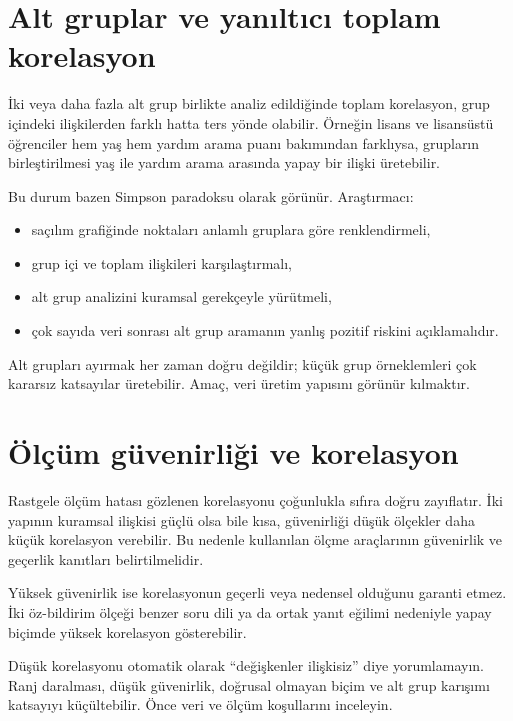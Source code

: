 \section{Alt gruplar ve yanıltıcı toplam korelasyon}

İki veya daha fazla alt grup birlikte analiz edildiğinde toplam korelasyon,
grup içindeki ilişkilerden farklı hatta ters yönde olabilir. Örneğin lisans ve
lisansüstü öğrenciler hem yaş hem yardım arama puanı bakımından farklıysa,
grupların birleştirilmesi yaş ile yardım arama arasında yapay bir ilişki
üretebilir.

Bu durum bazen Simpson paradoksu olarak görünür. Araştırmacı:

\begin{itemize}
  \item saçılım grafiğinde noktaları anlamlı gruplara göre renklendirmeli,
  \item grup içi ve toplam ilişkileri karşılaştırmalı,
  \item alt grup analizini kuramsal gerekçeyle yürütmeli,
  \item çok sayıda veri sonrası alt grup aramanın yanlış pozitif riskini açıklamalıdır.
\end{itemize}

Alt grupları ayırmak her zaman doğru değildir; küçük grup örneklemleri çok
kararsız katsayılar üretebilir. Amaç, veri üretim yapısını görünür kılmaktır.

\section{Ölçüm güvenirliği ve korelasyon}

Rastgele ölçüm hatası gözlenen korelasyonu çoğunlukla sıfıra doğru zayıflatır.
İki yapının kuramsal ilişkisi güçlü olsa bile kısa, güvenirliği düşük ölçekler
daha küçük korelasyon verebilir. Bu nedenle kullanılan ölçme araçlarının
güvenirlik ve geçerlik kanıtları belirtilmelidir.

Yüksek güvenirlik ise korelasyonun geçerli veya nedensel olduğunu garanti
etmez. İki öz-bildirim ölçeği benzer soru dili ya da ortak yanıt eğilimi
nedeniyle yapay biçimde yüksek korelasyon gösterebilir.

\begin{mistakebox}
Düşük korelasyonu otomatik olarak ``değişkenler ilişkisiz'' diye yorumlamayın.
Ranj daralması, düşük güvenirlik, doğrusal olmayan biçim ve alt grup karışımı
katsayıyı küçültebilir. Önce veri ve ölçüm koşullarını inceleyin.
\end{mistakebox}

